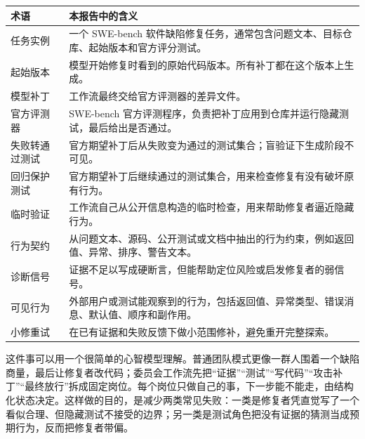 \documentclass[UTF8,a4paper,11pt]{ctexart}
\begin{document}
\begin{center}
{\small
\setlength{\tabcolsep}{3pt}
\begin{tabular}{L{4.2cm} L{10.1cm}}
\toprule
术语 & 本报告中的含义 \\
\midrule
任务实例 & 一个 SWE-bench 软件缺陷修复任务，通常包含问题文本、目标仓库、起始版本和官方评分测试。 \\
起始版本 & 模型开始修复时看到的原始代码版本。所有补丁都在这个版本上生成。 \\
模型补丁 & 工作流最终交给官方评测器的差异文件。 \\
官方评测器 & SWE-bench 官方评测程序，负责把补丁应用到仓库并运行隐藏测试，最后给出是否通过。 \\
失败转通过测试 & 官方期望补丁后从失败变为通过的测试集合；盲验证下生成阶段不可见。 \\
回归保护测试 & 官方期望补丁后继续通过的测试集合，用来检查修复有没有破坏原有行为。 \\
临时验证 & 工作流自己从公开信息构造的临时检查，用来帮助修复者逼近隐藏行为。 \\
行为契约 & 从问题文本、源码、公开测试或文档中抽出的行为约束，例如返回值、异常、排序、警告文本。 \\
诊断信号 & 证据不足以写成硬断言，但能帮助定位风险或启发修复者的弱信号。 \\
可见行为 & 外部用户或测试能观察到的行为，包括返回值、异常类型、错误消息、默认值、顺序和副作用。 \\
小修重试 & 在已有证据和失败反馈下做小范围修补，避免重开完整探索。 \\
\bottomrule
\end{tabular}
}
\end{center}

这件事可以用一个很简单的心智模型理解。普通团队模式更像一群人围着一个缺陷商量，最后让修复者改代码；委员会工作流先把“证据”“测试”“写代码”“攻击补丁”“最终放行”拆成固定岗位。每个岗位只做自己的事，下一步能不能走，由结构化状态决定。这样做的目的，是减少两类常见失败：一类是修复者凭直觉写了一个看似合理、但隐藏测试不接受的边界；另一类是测试角色把没有证据的猜测当成预期行为，反而把修复者带偏。
\end{document}
